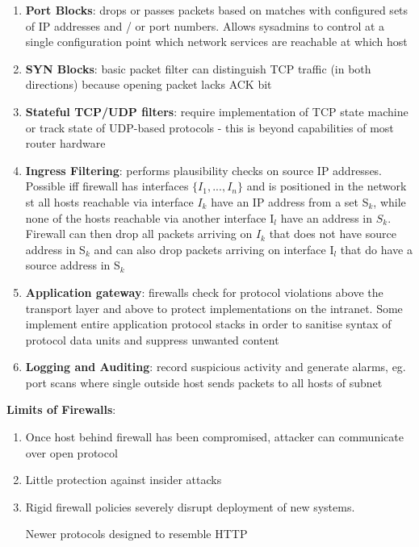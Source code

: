 \documentclass{article}
\newenvironment{pros}{\par\color[rgb]{0.066, 0.4, 0.129}}{\par}
\newenvironment{cons}{\par\color{red}}{\par}
\begin{document}
\begin{enumerate}
	\item \textbf{Port Blocks}: drops or passes packets based on matches with configured sets of IP addresses and / or port numbers. Allows sysadmins to control at a single configuration point which network services are reachable at which host
	
	\item \textbf{SYN Blocks}: basic packet filter can distinguish TCP traffic (in both directions) because opening packet lacks ACK bit
	
	\item \textbf{Stateful TCP/UDP filters}: require implementation of TCP state machine or track state of UDP-based protocols - this is beyond capabilities of most router hardware
	
	
	\item \textbf{Ingress Filtering}: performs plausibility checks on source IP addresses. Possible iff firewall has interfaces $\{I_{1}, ..., I_{n}\}$ and is positioned in the network st all hosts reachable via interface $I_{k}$ have an IP address from a set S$_{k}$, while none of the hosts reachable via another interface I$_{l}$ have an address in $S_{k}$. Firewall can then drop all packets arriving on $I_{k}$ that does not have source address in S$_{k}$ and can also drop packets arriving on interface I$_{l}$ that do have a source address in S$_{k}$
	
	\item \textbf{Application gateway}: firewalls check for protocol violations above the transport layer and above to protect implementations on the intranet. Some implement entire application protocol stacks in order to sanitise syntax of protocol data units and suppress unwanted content
	
	\item \textbf{Logging and Auditing}: record suspicious activity and generate alarms, eg. port scans where single outside host sends packets to all hosts of subnet
\end{enumerate}

\begin{cons}
\textbf{Limits of Firewalls}:
\begin{enumerate}
	\item Once host behind firewall has been compromised, attacker can communicate over open protocol
	
	\item Little protection against insider attacks
	
	\item Rigid firewall policies severely disrupt deployment of new systems. 
	\begin{pros}
		Newer protocols designed to resemble HTTP
	\end{pros}
\end{enumerate}
\end{cons}
\end{document}
